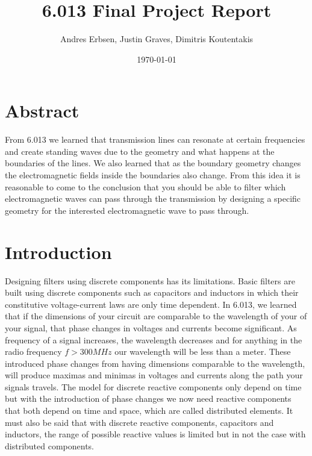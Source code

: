 \documentclass[letterpaper, 12pt]{article}
\begin{document}
\title{6.013 Final Project Report}
\author{Andres Erbsen, Justin Graves, Dimitris Koutentakis}
\date{\today}
\maketitle
\vspace{5mm}
\section{Abstract}
From 6.013 we learned that transmission lines can resonate at certain frequencies and create standing waves due to the geometry and what happens at the boundaries of the lines. We also learned that as the boundary geometry changes the electromagnetic fields inside the boundaries also change. From this idea it is reasonable to come to the conclusion that you should be able to filter which electromagnetic waves can pass through the transmission by designing a specific geometry for the interested electromagnetic wave to pass through.

\section {Introduction}
Designing filters using discrete components has its limitations. Basic filters are built using discrete components such as capacitors and inductors in which their constitutive voltage-current laws are only time dependent. In 6.013, we learned that if the dimensions of your circuit are comparable to the wavelength of your of your signal, that phase changes in voltages and currents become significant. As frequency of a signal increases, the wavelength decreases and for anything in the radio frequency $f > 300 MHz$ our wavelength will be less than a meter. These introduced phase changes from having dimensions comparable to the wavelength, will produce maximas and minimas in voltages and currents along the path your signals travels. The model for discrete reactive components only depend on time but with the introduction of phase changes we now need reactive components that both depend on time and space, which are called distributed elements. It must also be said that with discrete reactive components, capacitors and inductors, the range of possible reactive values is limited but in not the case with distributed components. 
\end{document}
